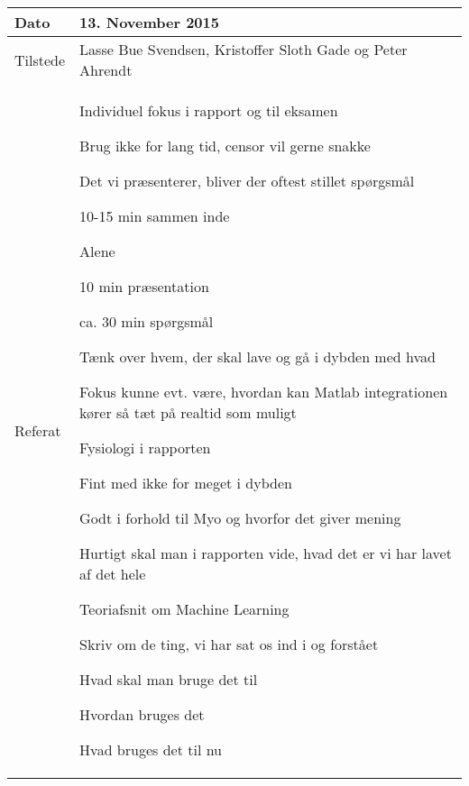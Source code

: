\begin{center}
	\begin{tabular}{| l | p{10cm} |}
		\hline
		Dato		& 13. November 2015\\ \hline
		Tilstede 	& Lasse Bue Svendsen, Kristoffer Sloth Gade og Peter Ahrendt\\ \hline
		Referat		& \vspace{-5mm}\begin{myEnumerate}
			\item Individuel fokus i rapport og til eksamen
			\begin{myItemize}				
				\item Brug ikke for lang tid, censor vil gerne snakke
				\item Det vi præsenterer, bliver der oftest stillet spørgsmål
				\item 10-15 min sammen inde
				\item Alene
				\begin{myItemize}
					\item 10 min præsentation
					\item ca. 30 min spørgsmål
				\end{myItemize}
				\item Tænk over hvem, der skal lave og gå i dybden med hvad
				\item Fokus kunne evt. være, hvordan kan Matlab integrationen kører så tæt på realtid som muligt
			\end{myItemize}
			\item Fysiologi i rapporten
			\begin{myItemize}
				\item Fint med ikke for meget i dybden
				\item Godt i forhold til Myo og hvorfor det giver mening
				\item Hurtigt skal man i rapporten vide, hvad det er vi har lavet af det hele
			\end{myItemize}
			\item Teoriafsnit om Machine Learning
			\begin{myItemize}
				\item Skriv om de ting, vi har sat os ind i og forstået
				\begin{myItemize}
					\item Hvad skal man bruge det til
					\item Hvordan bruges det
					\item Hvad bruges det til nu
				\end{myItemize}
			\end{myItemize}
		\end{myEnumerate}\\ 	
		\hline
	\end{tabular}
\end{center}

